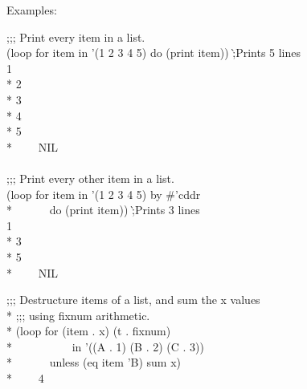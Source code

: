 \begin{defloop}
Examples:
\begin{lisp}
;;; Print every item in a list. \\[3pt]
(loop for item in '(1 2 3 4 5) do (print item)) \`;{\rm Prints 5 lines} \\
1 \\*
2 \\*
3 \\*
4 \\*
5 \\*
~~~\EV~NIL \\
 \\
;;; Print every other item in a list. \\[3pt]
(loop for item in '(1 2 3 4 5) by \#'cddr \\*
~~~~~~do (print item))  \`;{\rm Prints 3 lines} \\
1 \\*
3 \\*
5 \\*
~~~\EV~NIL
\end{lisp}
\begin{lisp}
;;; Destructure items of a list, and sum the x values \\*
;;; using fixnum arithmetic. \\*
(loop for (item . x) (t . fixnum) \\*
~~~~~~~~~~in '((A . 1) (B . 2) (C . 3)) \\*
~~~~~~unless (eq item 'B) sum x) \\*
~~~\EV~4
\end{lisp}
\end{defloop}

